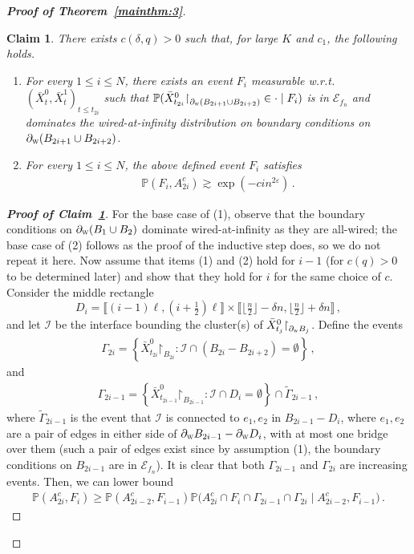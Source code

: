 \documentclass[reqno,11pt]{amsart}
\numberwithin{equation}{section}
\renewcommand{\restriction}{\mathord{\upharpoonright}}
\renewcommand{\epsilon}{\varepsilon}
\newcommand{\given}{\;\big|\;}
\newtheorem{claim}[theorem]{Claim}
\theoremstyle{definition}{
\newtheorem{example}[theorem]{Example}
\newtheorem{definition}[theorem]{Definition}
\newtheorem*{definition*}{Definition}
\newtheorem{problem}[theorem]{Problem}
\newtheorem{question}[theorem]{Question}
\newtheorem{remark}[theorem]{Remark}
}
\renewcommand{\P}{\mathbb P}
\newcommand{\llb }{\llbracket}
\newcommand{\rrb }{\rrbracket}
\renewcommand{\epsilon}{\varepsilon}
\newcommand{\west}{{\textsc{w}}}
\begin{document}
\begin{proof}[\textbf{\emph{Proof of Theorem~\ref{mainthm:3}}}]
\begin{claim}\label{claim:induction2}
There exists $c(\delta,q)>0$ such that, for large $K$ and $c_1$, the following holds.
\begin{enumerate}[(1)]
	\item For every $1\leq i \leq N$, there exists an event $F_i$ measurable w.r.t.\ $(\bar X_t^0,\bar X_t^1)_{t\leq t_{2i}}$ such that $\P(\bar X_{t_{2i}}^0 \restriction_{\partial_{\west}(B_{2i+1}\cup B_{2i+2})}\in \cdot \mid F_{i})$ is in $\mathcal E_{f_n}$ and dominates the wired-at-infinity distribution on boundary conditions on $\partial_\west (B_{2i+1}\cup B_{2i+2})$.
	\item For every $1\leq i \leq N$, the above defined event $F_i$ satisfies
\begin{align*}
\mathbb P (F_i, A_{2i}^c) \gtrsim \exp(-cin^{2\epsilon})\,.
\end{align*}
\end{enumerate}
\end{claim}
\begin{proof}[\textbf{\emph{Proof of Claim~\ref{claim:induction2}}}]For the base case of (1), observe that the boundary conditions on $\partial_\west (B_1 \cup B_2)$ dominate wired-at-infinity as they are all-wired; the base case of (2) follows as the proof of the inductive step does, so we do not repeat it here. Now assume that items (1) and (2) hold for $i-1$ (for $c( q)>0$ to be determined later) and show that they hold for $i$ for the same choice of $c$. Consider the middle rectangle
\[D_i=\llb (i-1)\ell,(i+\tfrac 12)\ell\rrb \times \llb \lfloor \tfrac n2\rfloor - \delta n,\lfloor \tfrac n2 \rfloor +\delta n\rrb\,,
\]
and let $\mathcal I$ be the interface bounding the cluster(s) of $\bar X^0_{t_j}\restriction_{\partial_\west B_{j}}$. Define the events
\begin{align*}
\Gamma_{2i} = \left\{\bar X_{t_{2i}}^0 \restriction_{B_{2i}}:\mathcal I \cap (B_{2i} - B_{2i+2}) = \emptyset\right\}\,,
\end{align*}
and
\begin{align*}
\Gamma_{2i-1} = \left\{\bar X_{t_{2i-1}}^0 \restriction_{B_{2i-1}}: \mathcal I \cap D_{i}=\emptyset\right\}\cap \tilde \Gamma_{2i-1}\,,
\end{align*}
where $\tilde \Gamma_{2i-1}$ is the event that $\mathcal I$ is connected to $e_1, e_2$ in $B_{2i-1}- D_i$, where $e_1, e_2$ are a pair of edges in either side of $\partial_\west B_{2i-1}- \partial_\west D_i$, with at most one bridge over them (such a pair of edges exist since by assumption (1), the boundary conditions on $B_{2i-1}$ are in $\mathcal E_{f_n}$). 
It is clear that both $\Gamma_{2i-1}$ and $\Gamma_{2i}$ are increasing events.
Then, we can lower bound 
\begin{align}\label{eq:probability-to-couple-2}
\mathbb P(A_{2i}^c, F_i) \geq \mathbb P(A_{2i-2}^c ,F_{i-1})\mathbb P\Big(A_{2i}^c\cap F_i \cap \Gamma_{2i-1}\cap \Gamma_{2i} \given A_{2i-2}^c , F_{i-1}\Big)\,.
\end{align}


\end{proof}
\end{proof}
\end{document}
